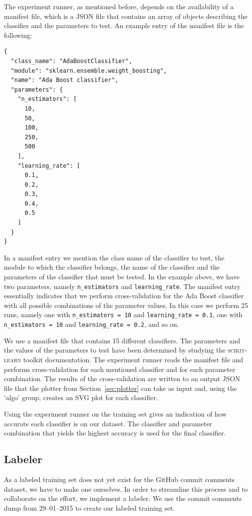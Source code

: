 \documentclass{article}
\begin{document}
The experiment runner, as mentioned before, depends on the availability of
a manifest file, which is a JSON file that contains an array of objects
describing the classifier and the parameters to test. An example entry
of the manifest file is the following:

\begin{verbatim}
{
  "class_name": "AdaBoostClassifier",
  "module": "sklearn.ensemble.weight_boosting",
  "name": "Ada Boost classifier",
  "parameters": {
    "n_estimators": [
      10,
      50,
      100,
      250,
      500
    ],
    "learning_rate": [
      0.1,
      0.2,
      0.3,
      0.4,
      0.5
    ]
  }
}
\end{verbatim}

In a manifest entry we mention the class name of the classifier to test, the
module to which the classifier belongs, the name of the classifier and the
parameters of the classifier that must be tested. In the example above, we have 
two parameters, namely {\tt n\_estimators} and
{\tt learning\_rate}. The manifest entry essentially indicates that we perform
cross-validation for the Ada Boost classifier with all possible combinations
of the parameter values. In this case we perform 25 runs, namely one with
{\tt n\_estimators = 10} and {\tt learning\_rate = 0.1}, one with
{\tt n\_estimators = 10} and {\tt learning\_rate = 0.2}, and so on.

We use a manifest file that contains 15 different classifiers. The
parameters and the values of the parameters to test have been determined by
studying the \textsc{scikit-learn} toolkit documentation. The experiment runner
reads the manifest file and performs cross-validation for each mentioned
classifier and for each parameter combination. The results of the
cross-validation are written to an output JSON file that the plotter from
Section~\ref{sec:plotter} can take as input and, using the `algo' group,
creates an SVG plot for each classifier.

Using the experiment runner on the training set gives an indication of
how accurate each classifier is on our dataset. The classifier and
parameter combination that yields the highest accuracy is used for the
final classifier.

\subsection{Labeler}\label{sec:labeler}
As a labeled training set does not yet exist for the GitHub commit comments
dataset, we have to make one ourselves. In order to streamline this process
and to collaborate on the effort, we implement a labeler. We use the commit
comments dump from 29--01--2015 to create our labeled training set.
\end{document}

